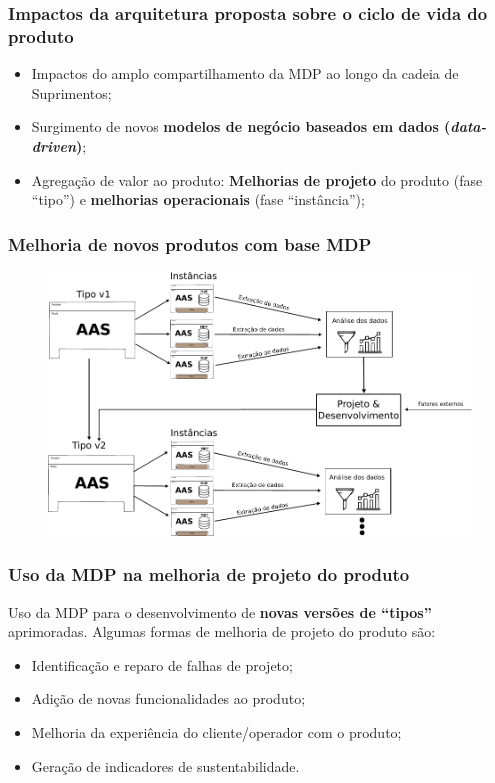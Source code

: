 \documentclass[10pt]{beamer}
\begin{document}
\begin{frame}
	\frametitle{Impactos da arquitetura proposta sobre o ciclo de vida do produto}
	
	\begin{itemize}
		\item Impactos do amplo compartilhamento da MDP ao longo da cadeia de Suprimentos;
		\item Surgimento de novos \textbf{modelos de negócio baseados em dados (\textit{data-driven})};
		\item Agregação de valor ao produto: \textbf{Melhorias de projeto} do produto (fase ``tipo'') e \textbf{melhorias operacionais} (fase ``instância'');
	\end{itemize}
	
\end{frame}
\begin{frame}
	\frametitle{Melhoria de novos produtos com base MDP}
	
	\begin{figure}[htb!]
		\centering
		\label{fig:aas-lifecycle}
		\includegraphics[width=1\textwidth]{aas-lifecycle}
	\end{figure}
	
\end{frame}
\begin{frame}
	\frametitle{Uso da MDP na melhoria de projeto do produto}
	
	Uso da MDP para o desenvolvimento de \textbf{novas versões de ``tipos''} aprimoradas. Algumas formas de melhoria de projeto do produto são:
	
	\begin{itemize}
		\item Identificação e reparo de falhas de projeto;
		\item Adição de novas funcionalidades ao produto;
		\item Melhoria da experiência do cliente/operador com o produto;
		\item Geração de indicadores de sustentabilidade.
	\end{itemize}
	
\end{frame}
\end{document}
